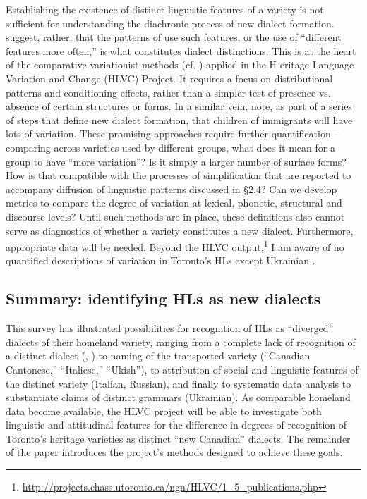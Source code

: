 \documentclass[output=paper]{LSP/langsci}
\begin{document}
Establishing the existence of distinct linguistic features of a variety is not sufficient for understanding the diachronic process of new dialect formation. \citet[6]{auer_study_2004} suggest, rather, that the patterns of use such features, or the use of “different features more often,” is what constitutes dialect distinctions. This is at the heart of the comparative variationist methods (cf. \citealt{cacoullos_testing_2010}) applied in the H
eritage Language Variation and Change (HLVC) Project. It requires a focus on distributional patterns and conditioning effects, rather than a simpler test of presence vs. absence of certain structures or forms. In a similar vein, \citet[215]{auer_birth_2004} note, as part of a series of steps that define new dialect formation, that children of immigrants will have lots of variation. These promising approaches require further quantification – comparing across varieties used by different groups, what does it mean for a group to have “more variation”? Is it simply a larger number of surface forms? How is that compatible with the processes of simplification that are reported to accompany diffusion of linguistic patterns discussed in §2.4? Can we develop metrics to compare the degree of variation at lexical, phonetic, structural and discourse levels? Until such methods are in place, these definitions also cannot serve as diagnostics of whether a variety constitutes a new dialect. Furthermore, appropriate data will be needed. Beyond the HLVC output,\footnote{\url{http://projects.chass.utoronto.ca/ngn/HLVC/1_5_publications.php}} I am aware of no quantified descriptions of variation in Toronto’s HLs except Ukrainian \citep{budzhak-jones_variable_1994,chumak-horbatsch_language_1987}. 

\subsection{Summary: identifying HLs as new dialects}

This survey has illustrated possibilities for recognition of HLs as “diverged” dialects of their homeland variety, ranging from a complete lack of recognition of a distinct dialect (, ) to naming of the transported variety (“Canadian Cantonese,” “Italiese,” “Ukish”), to attribution of social and linguistic features of the distinct variety (Italian, Russian), and finally to systematic data analysis to substantiate claims of distinct grammars (Ukrainian). As comparable homeland data become available, the HLVC project will be able to investigate both linguistic and attitudinal features for the difference in degrees of recognition of Toronto’s heritage varieties as distinct “new Canadian” dialects. The remainder of the paper introduces the project’s methods designed to achieve these goals.
\end{document}
